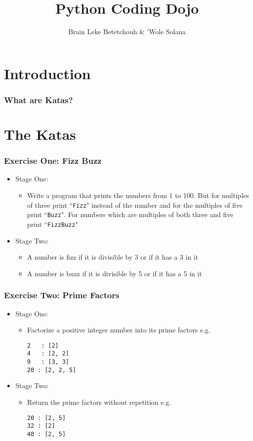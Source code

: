 \documentclass[10pt,t,sans,mathsans,xcolor=dvipsnames]{beamer}
\title{ Python Coding Dojo }
\author{ Brain Leke Betetchouh \& 'Wole Solana }
\begin{document}
\frame [c, plain]{\titlepage}
\section{Introduction}
\begin{frame}
\frametitle{What are Katas?}
\end{frame}
\section{The Katas}
\begin{frame}[fragile]
\frametitle{Exercise One: Fizz Buzz}
\begin{itemize}
\item Stage One:
\begin{itemize}
\item Write a program that prints the numbers from 1 to 100. But for multiples of three print ``\texttt{Fizz}" instead of the number and for the multiples of five print ``\texttt{Buzz}". For numbers which are multiples of both three and five print ``\texttt{FizzBuzz}"
\end{itemize}
\item Stage Two:
\begin{itemize}
\item A number is fizz if it is divisible by 3 or if it has a 3 in it
\item A number is buzz if it is divisible by 5 or if it has a 5 in it
\end{itemize}
\end{itemize}
\end{frame}
\begin{frame}[fragile]
\frametitle{Exercise Two: Prime Factors}
\begin{itemize}
\item Stage One:
\begin{itemize}
\item Factorize a positive integer number into its prime factors e.g.
\begin{verbatim}
2 	: [2]
4 	: [2, 2]
9 	: [3, 3]
20 : [2, 2, 5]
\end{verbatim}
\end{itemize}
\item Stage Two:
\begin{itemize}
\item Return the prime factors without repetition e.g.
\begin{verbatim}
20 : [2, 5]
32 : [2]
40 : [2, 5]
\end{verbatim}
\end{itemize}
\end{itemize}
\end{frame}
\end{document}
